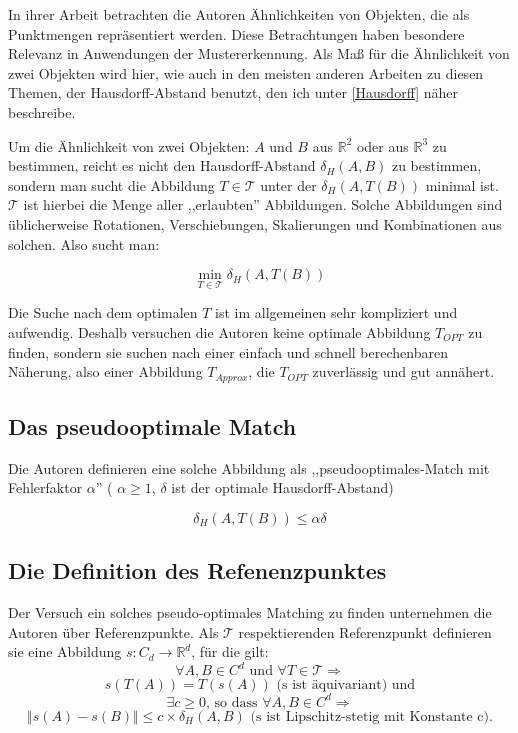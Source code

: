 In ihrer Arbeit betrachten die Autoren Ähnlichkeiten von Objekten, die als Punktmengen repräsentiert werden. Diese Betrachtungen haben besondere Relevanz in Anwendungen der Mustererkennung. Als Maß für die Ähnlichkeit von zwei Objekten wird hier, wie auch in den meisten anderen Arbeiten zu diesen Themen, der Hausdorff-Abstand benutzt, den ich unter \ref{Hausdorff} näher beschreibe.

Um die Ähnlichkeit von zwei Objekten: $A$ und $B$ aus $\mathbb{R}^2$ oder aus $\mathbb{R}^3$ zu bestimmen, reicht es nicht den Hausdorff-Abstand $\delta_H(A,B)$ zu bestimmen, sondern man sucht die Abbildung $T\in\mathcal{T}$ unter der $\delta_H(A,T(B))$ minimal ist. $\mathcal{T}$ ist hierbei die Menge aller ,,erlaubten'' Abbildungen. Solche Abbildungen sind üblicherweise Rotationen, Verschiebungen, Skalierungen und Kombinationen aus solchen. Also sucht man:

$$\min_{T\in\mathcal{T}}\delta_H(A,T(B))$$

Die Suche nach dem optimalen $T$ ist im allgemeinen sehr kompliziert und aufwendig. Deshalb versuchen die Autoren keine optimale Abbildung $T_{OPT}$ zu finden, sondern sie suchen nach einer einfach und schnell berechenbaren Näherung, also einer Abbildung $T_{Approx}$, die $T_{OPT}$ zuverlässig und gut annähert.

\subsection{Das pseudooptimale Match}

Die Autoren definieren eine solche Abbildung als ,,pseudooptimales-Match mit Fehlerfaktor $\alpha$'' ( $\alpha\geq 1$, $\delta$ ist der optimale Hausdorff-Abstand)

$$\delta_H(A,T(B))\leq \alpha \delta$$

\subsection{Die Definition des Refenenzpunktes}

Der Versuch ein solches pseudo-optimales Matching zu finden unternehmen die Autoren über Referenzpunkte. Als $\mathcal{T}$ respektierenden Referenzpunkt definieren sie eine Abbildung $s:C_d\longrightarrow\mathbb{R}^d$, für die gilt:
$$\forall A, B\in C^d \text{ und } \forall T\in\mathcal{T}\Rightarrow$$
$$s(T(A))=T(s(A))\text{ (s ist äquivariant) und}$$
$$\exists c\geq0 \text{, so dass } \forall A, B \in C^d\Rightarrow$$
$$\Vert s(A)-s(B)\Vert\leq c\times\delta_H(A,B)\text{ (s ist Lipschitz-stetig mit Konstante c)}.$$


